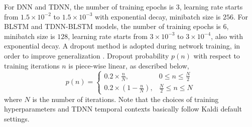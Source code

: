 \documentclass[a4paper]{article}
\begin{document}
For DNN and TDNN, the number of training epochs is $3$, learning rate starts from $1.5\times 10^{-2}$ to $1.5\times 10^{-3}$ with exponential decay, minibatch size is $256$. For BLSTM and TDNN-BLSTM models, the number of training epochs is $6$, minibatch size is $128$, learning rate starts from $3\times 10^{-3}$ to $3\times 10^{-4}$, also with exponential decay.
A dropout method is adopted during network training,
in order to improve generalization \cite{chengexploration}. Dropout probability $p(n)$ with respect to training iterations $n$ is  piece-wise linear, as described below,
\begin{equation}
    p(n)=
   \begin{cases}
   0.2 \times \frac{n}{N}, &\mbox{$0 \le n \le \frac{N}{2}$}\\
   0.2 \times (1-\frac{n}{N}), &\mbox{$\frac{N}{2} \le n \le N$}
   \end{cases}
  \end{equation}
where $N$ is the number of iterations. Note that the choices of training hyperparameters and TDNN temporal contexts basically follow Kaldi default settings.

\end{document}
